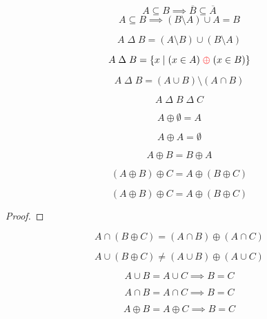 \begin{frame}{}
  \begin{theorem}
    \[
      A \subseteq B \implies \overline{B} \subseteq \overline{A}
    \]
    \[
      A \subseteq B \implies (B \setminus A) \cup A = B
    \]
  \end{theorem}
\end{frame}

\begin{frame}{}
  \begin{definition}
    \[
      A \;\Delta\; B = (A \setminus B) \cup (B \setminus A)
    \]
  \end{definition}

  \[
    A \;\Delta\; B = \{x \mid (x \in A) \;\textcolor{red}{\oplus}\; (x \in B)\}
  \]

  \pause
  \vspace{0.30cm}

  \pause
  \[
    A \;\Delta\; B = (A \cup B) \setminus (A \cap B)
  \]
\end{frame}

\begin{frame}{}
  \[
    A \;\Delta\; B \;\Delta\; C
  \]

  \pause
\end{frame}

\begin{frame}{}
  \[
    A \oplus \emptyset = A
  \]

  \pause
  \[
    A \oplus A = \emptyset
  \]

  \[
    A \oplus B = B \oplus A
  \]

  \[
    (A \oplus B) \oplus C = A \oplus (B \oplus C)
  \]
\end{frame}

\begin{frame}{}
  \[
    (A \oplus B) \oplus C = A \oplus (B \oplus C)
  \]

  \begin{proof}
    
  \end{proof}
\end{frame}

\begin{frame}{}
  \[
    A \cap (B \oplus C) = (A \cap B) \oplus (A \cap C)
  \]

  \pause
  \[
    A \cup (B \oplus C) \neq (A \cup B) \oplus (A \cup C)
  \]
\end{frame}

\begin{frame}{}
  \[
    A \cup B = A \cup C \implies B = C
  \]

  \[
    A \cap B = A \cap C \implies B = C
  \]


  \[
    A \oplus B = A \oplus C \implies B = C
  \]
\end{frame}
